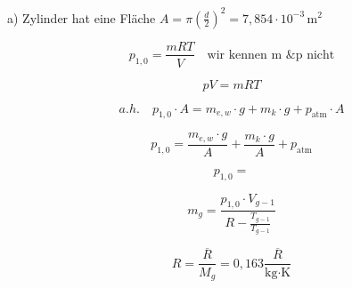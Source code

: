 a) Zylinder hat eine Fläche $A = \pi \left( \frac{d}{2} \right)^2 = 7,854 \cdot 10^{-3} \, \text{m}^2$

\[
p_{1,0} = \frac{mRT}{V} \quad \text{wir kennen m \& p nicht}
\]

\[
pV = mRT
\]

\[
a.h. \quad p_{1,0} \cdot A = m_{e,w} \cdot g + m_{k} \cdot g + p_{\text{atm}} \cdot A
\]

\[
p_{1,0} = \frac{m_{e,w} \cdot g}{A} + \frac{m_{k} \cdot g}{A} + p_{\text{atm}}
\]

\[
p_{1,0} = 
\]

\[
m_{g} = \frac{p_{1,0} \cdot V_{g-1}}{R - \frac{T_{g-1}}{T_{g-1}}}
\]

\[
R = \frac{\overline{R}}{M_{g}} = 0,163 \frac{\overline{R}}{\text{kg} \cdot \text{K}}
\]